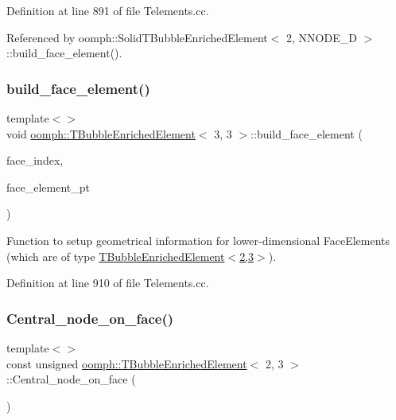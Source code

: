 Definition at line 891 of file Telements.\+cc.



Referenced by oomph\+::\+Solid\+T\+Bubble\+Enriched\+Element$<$ 2, N\+N\+O\+D\+E\+\_\+D $>$\+::build\+\_\+face\+\_\+element().

\mbox{\label{classoomph_1_1TBubbleEnrichedElement_a546cbc867bc47ac24a8ff1a2fdd5301e}} 
\subsubsection{\texorpdfstring{build\+\_\+face\+\_\+element()}{build\_face\_element()}\hspace{0.1cm}{\footnotesize\ttfamily [2/2]}}
{\footnotesize\ttfamily template$<$$>$ \\
void \hyperlink{classoomph_1_1TBubbleEnrichedElement}{oomph\+::\+T\+Bubble\+Enriched\+Element}$<$ 3, 3 $>$\+::build\+\_\+face\+\_\+element (\begin{DoxyParamCaption}\item[{const int \&}]{face\+\_\+index,  }\item[{\hyperlink{classoomph_1_1FaceElement}{Face\+Element} $\ast$}]{face\+\_\+element\+\_\+pt }\end{DoxyParamCaption})}

Function to setup geometrical information for lower-\/dimensional Face\+Elements (which are of type \hyperlink{classoomph_1_1TBubbleEnrichedElement}{T\+Bubble\+Enriched\+Element$<$2,3$>$}). 

Definition at line 910 of file Telements.\+cc.

\mbox{\label{classoomph_1_1TBubbleEnrichedElement_a0e194b044971e86f061500a8b1ecfc58}} 
\subsubsection{\texorpdfstring{Central\+\_\+node\+\_\+on\+\_\+face()}{Central\_node\_on\_face()}\hspace{0.1cm}{\footnotesize\ttfamily [1/2]}}
{\footnotesize\ttfamily template$<$$>$ \\
const unsigned \hyperlink{classoomph_1_1TBubbleEnrichedElement}{oomph\+::\+T\+Bubble\+Enriched\+Element}$<$ 2, 3 $>$\+::Central\+\_\+node\+\_\+on\+\_\+face (\begin{DoxyParamCaption}{ }\end{DoxyParamCaption})}



